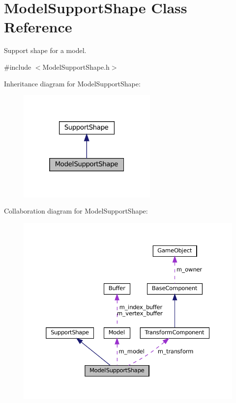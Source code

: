 \hypertarget{classModelSupportShape}{}\section{Model\+Support\+Shape Class Reference}
\label{classModelSupportShape}


Support shape for a model.  




{\ttfamily \#include $<$Model\+Support\+Shape.\+h$>$}



Inheritance diagram for Model\+Support\+Shape\+:
\nopagebreak
\begin{figure}[H]
\begin{center}
\leavevmode
\includegraphics[width=193pt]{classModelSupportShape__inherit__graph}
\end{center}
\end{figure}


Collaboration diagram for Model\+Support\+Shape\+:
\nopagebreak
\begin{figure}[H]
\begin{center}
\leavevmode
\includegraphics[width=350pt]{classModelSupportShape__coll__graph}
\end{center}
\end{figure}
